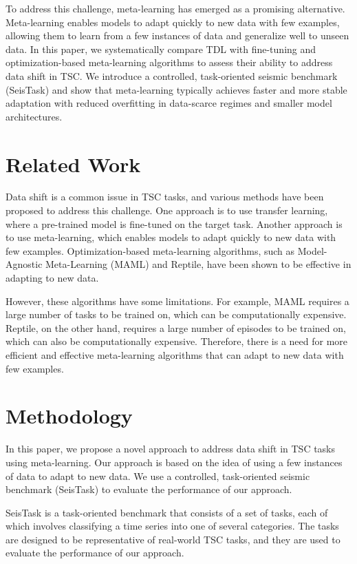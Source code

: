 \documentclass{article}
\begin{document}
To address this challenge, meta-learning has emerged as a promising alternative. Meta-learning enables models to adapt quickly to new data with few examples, allowing them to learn from a few instances of data and generalize well to unseen data. In this paper, we systematically compare TDL with fine-tuning and optimization-based meta-learning algorithms to assess their ability to address data shift in TSC. We introduce a controlled, task-oriented seismic benchmark (SeisTask) and show that meta-learning typically achieves faster and more stable adaptation with reduced overfitting in data-scarce regimes and smaller model architectures.

\section{Related Work}
Data shift is a common issue in TSC tasks, and various methods have been proposed to address this challenge. One approach is to use transfer learning, where a pre-trained model is fine-tuned on the target task. Another approach is to use meta-learning, which enables models to adapt quickly to new data with few examples. Optimization-based meta-learning algorithms, such as Model-Agnostic Meta-Learning (MAML) and Reptile, have been shown to be effective in adapting to new data.

However, these algorithms have some limitations. For example, MAML requires a large number of tasks to be trained on, which can be computationally expensive. Reptile, on the other hand, requires a large number of episodes to be trained on, which can also be computationally expensive. Therefore, there is a need for more efficient and effective meta-learning algorithms that can adapt to new data with few examples.

\section{Methodology}
In this paper, we propose a novel approach to address data shift in TSC tasks using meta-learning. Our approach is based on the idea of using a few instances of data to adapt to new data. We use a controlled, task-oriented seismic benchmark (SeisTask) to evaluate the performance of our approach.

SeisTask is a task-oriented benchmark that consists of a set of tasks, each of which involves classifying a time series into one of several categories. The tasks are designed to be representative of real-world TSC tasks, and they are used to evaluate the performance of our approach.
\end{document}
